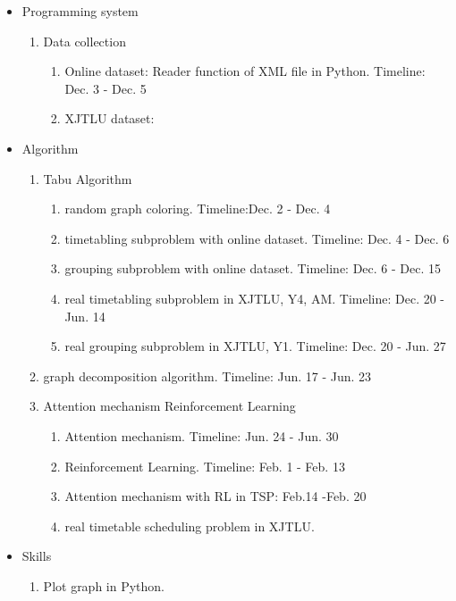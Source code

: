 \documentclass{article}
\begin{document}
\begin{itemize}
	\item Programming system
	      \begin{enumerate}
		      \item Data collection
		            \begin{enumerate}
			            \item Online dataset: Reader function of XML file in Python. Timeline: Dec. 3 - Dec. 5
			            \item XJTLU dataset:
		            \end{enumerate}
	      \end{enumerate}
	\item Algorithm
	      \begin{enumerate}
		      \item Tabu Algorithm
		            \begin{enumerate}
			            \item random graph coloring. Timeline:Dec. 2 - Dec. 4
			            \item timetabling subproblem with online dataset. Timeline: Dec. 4 - Dec. 6
			            \item grouping subproblem with online dataset. Timeline: Dec. 6 - Dec. 15
			            \item real timetabling subproblem in XJTLU, Y4, AM. Timeline: Dec. 20 - Jun. 14
			            \item real grouping subproblem in XJTLU, Y1. Timeline: Dec. 20 - Jun. 27
		            \end{enumerate}
		      \item graph decomposition algorithm. Timeline: Jun. 17 - Jun. 23
		      \item Attention mechanism Reinforcement Learning
		            \begin{enumerate}
			            \item Attention mechanism. Timeline: Jun. 24 - Jun. 30
			            \item Reinforcement Learning. Timeline: Feb. 1 - Feb. 13
			            \item Attention mechanism with RL in TSP: Feb.14 -Feb. 20
			            \item real timetable scheduling problem in XJTLU.
		            \end{enumerate}
	      \end{enumerate}
	\item Skills
	      \begin{enumerate}
		      \item Plot graph in Python.
	      \end{enumerate}
\end{itemize}




\end{document}
